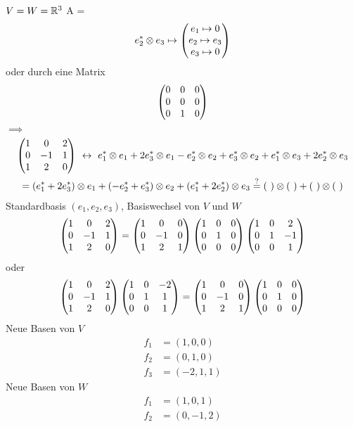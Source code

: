 \begin{Bsp}
  $V=W=\mathbb{R}^3$
  A = \[e_2^*\otimes e_3\mapsto \begin{pmatrix}e_1\mapsto 0 \\ e_2\mapsto e_3\\e_3\mapsto 0\end{pmatrix}\]
  oder durch eine Matrix
  \[\begin{pmatrix}0&0&0\\0&0&0\\0&1&0\end{pmatrix}\]
  $\implies$
  \begin{gather*}
    \Mx{1&0&2\\0&-1&1\\1&2&0}\ \lra\ e_1^*\otimes e_1+2e_3^*\otimes e_1-e_2^*\otimes e_2+e_3^*\otimes e_2+e_1^*\otimes e_3+2e_2^*\otimes e_3\\
    =\left( e_1^*+2e_3^* \right)\otimes e_1+\left( -e_2^*+e_3^* \right)\otimes e_2+\left( e_1^*+2e_2^* \right)\otimes e_3 \stackrel{?}{=} \left( \  \right)\otimes \left( \  \right)+\left( \  \right)\otimes \left( \ \right)
  \end{gather*}
  Standardbasis $(e_1,e_2,e_3)$, Basiswechsel von $V$ und $W$
  \begin{gather*}
    \begin{pmatrix}1&0&2\\0&-1&1\\1&2&0\end{pmatrix} = \begin{pmatrix}1&0&0\\0&-1&0\\1&2&1\end{pmatrix}\begin{pmatrix}1&0&0\\0&1&0\\0&0&0\end{pmatrix}\begin{pmatrix}1&0&2\\0&1&-1\\0&0&1\end{pmatrix}
  \end{gather*}
  oder
  \begin{gather*}
    \begin{pmatrix}1&0&2\\0&-1&1\\1&2&0\end{pmatrix}\begin{pmatrix}1&0&-2\\0&1&1\\0&0&1\end{pmatrix}=\begin{pmatrix}1&0&0\\0&-1&0\\1&2&1\end{pmatrix}\begin{pmatrix}1&0&0\\0&1&0\\0&0&0\end{pmatrix}
  \end{gather*}
  Neue Basen von $V$
  \begin{align*}
    f_1&=\left( 1,0,0 \right)\\
    f_2&=\left( 0,1,0 \right)\\
    f_3&=\left( -2,1,1 \right)
  \end{align*}
  Neue Basen von $W$
  \begin{align*}
    f_1&=\left( 1,0,1 \right)\\
    f_2&=\left( 0,-1,2 \right)\\

\end{align*}
\end{Bsp}

